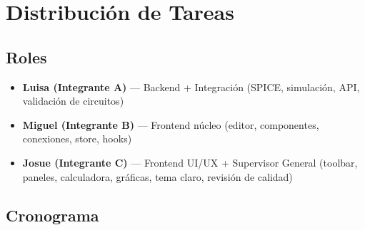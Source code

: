 \documentclass[12pt,a4paper]{article}
\begin{document}
\section{Distribución de Tareas}

\subsection*{Roles}
\begin{itemize}
    \item \textbf{Luisa (Integrante A)} — Backend + Integración (SPICE, simulación, API, validación de circuitos)
    \item \textbf{Miguel (Integrante B)} — Frontend núcleo (editor, componentes, conexiones, store, hooks)
    \item \textbf{Josue (Integrante C)} — Frontend UI/UX + Supervisor General (toolbar, paneles, calculadora, gráficas, tema claro, revisión de calidad)
\end{itemize}

\subsection*{Cronograma}
\end{document}
